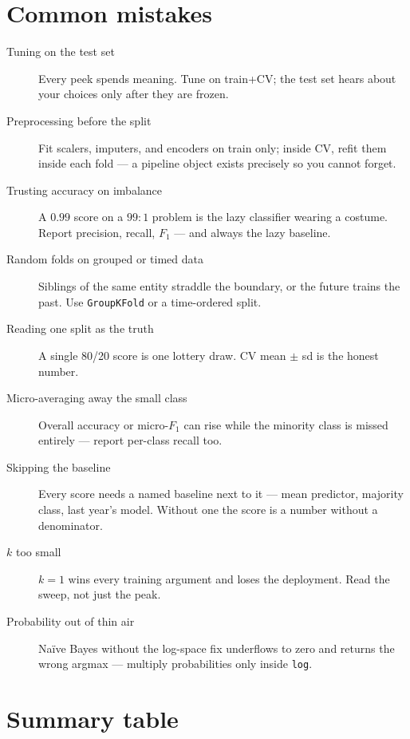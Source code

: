\section{Common mistakes}

\begin{description}
\item[Tuning on the test set] Every peek spends meaning. Tune on
  train+CV; the test set hears about your choices only after they are
  frozen.
\item[Preprocessing before the split] Fit scalers, imputers, and
  encoders on train only; inside CV, refit them inside each fold --- a
  pipeline object exists precisely so you cannot forget.
\item[Trusting accuracy on imbalance] A $0.99$ score on a $99{:}1$
  problem is the lazy classifier wearing a costume. Report precision,
  recall, $F_1$ --- and always the lazy baseline.
\item[Random folds on grouped or timed data] Siblings of the same entity
  straddle the boundary, or the future trains the past. Use
  \texttt{GroupKFold} or a time-ordered split.
\item[Reading one split as the truth] A single 80/20 score is one lottery
  draw. CV mean $\pm$ sd is the honest number.
\item[Micro-averaging away the small class] Overall accuracy or
  micro-$F_1$ can rise while the minority class is missed entirely ---
  report per-class recall too.
\item[Skipping the baseline] Every score needs a named baseline next to
  it --- mean predictor, majority class, last year's model. Without one
  the score is a number without a denominator.
\item[$k$ too small] $k{=}1$ wins every training argument and loses the
  deployment. Read the sweep, not just the peak.
\item[Probability out of thin air] Na\"ive Bayes without the log-space
  fix underflows to zero and returns the wrong argmax --- multiply
  probabilities only inside \texttt{log}.
\end{description}

\section{Summary table}

